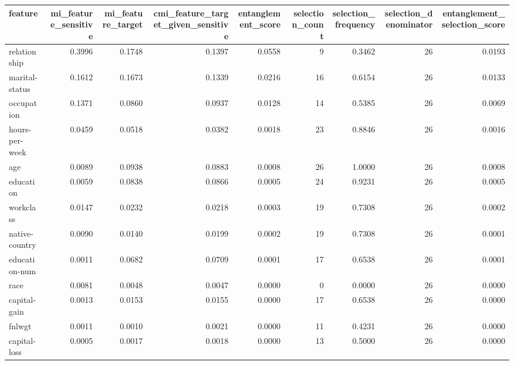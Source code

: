 \begin{tabular}{lrrrrrrrr}
\toprule
feature & mi\_feature\_sensitive & mi\_feature\_target & cmi\_feature\_target\_given\_sensitive & entanglement\_score & selection\_count & selection\_frequency & selection\_denominator & entanglement\_selection\_score \\
\midrule
relationship & 0.3996 & 0.1748 & 0.1397 & 0.0558 & 9 & 0.3462 & 26 & 0.0193 \\
marital-status & 0.1612 & 0.1673 & 0.1339 & 0.0216 & 16 & 0.6154 & 26 & 0.0133 \\
occupation & 0.1371 & 0.0860 & 0.0937 & 0.0128 & 14 & 0.5385 & 26 & 0.0069 \\
hours-per-week & 0.0459 & 0.0518 & 0.0382 & 0.0018 & 23 & 0.8846 & 26 & 0.0016 \\
age & 0.0089 & 0.0938 & 0.0883 & 0.0008 & 26 & 1.0000 & 26 & 0.0008 \\
education & 0.0059 & 0.0838 & 0.0866 & 0.0005 & 24 & 0.9231 & 26 & 0.0005 \\
workclass & 0.0147 & 0.0232 & 0.0218 & 0.0003 & 19 & 0.7308 & 26 & 0.0002 \\
native-country & 0.0090 & 0.0140 & 0.0199 & 0.0002 & 19 & 0.7308 & 26 & 0.0001 \\
education-num & 0.0011 & 0.0682 & 0.0709 & 0.0001 & 17 & 0.6538 & 26 & 0.0001 \\
race & 0.0081 & 0.0048 & 0.0047 & 0.0000 & 0 & 0.0000 & 26 & 0.0000 \\
capital-gain & 0.0013 & 0.0153 & 0.0155 & 0.0000 & 17 & 0.6538 & 26 & 0.0000 \\
fnlwgt & 0.0011 & 0.0010 & 0.0021 & 0.0000 & 11 & 0.4231 & 26 & 0.0000 \\
capital-loss & 0.0005 & 0.0017 & 0.0018 & 0.0000 & 13 & 0.5000 & 26 & 0.0000 \\
\bottomrule
\end{tabular}
